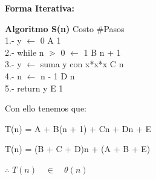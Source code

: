 \documentclass[spanish]{article}
\begin{document}
	\bigskip

	{\bf{Forma Iterativa:}}

	\bigskip

	{\bf Algoritmo S(n)} \hspace{40mm}Costo \hspace{12mm} \#Pasos \\
	1.- \hspace{0.7cm}y $\leftarrow$ 0 \hspace{5.6cm} A \hspace{2.0cm} 1\\
	2.- \hspace{0.7cm}while n $\gtrdot$ 0 $\leftarrow$ 1 \hspace{4.0cm} B \hspace{2.0cm} n + 1\\
	3.-	\hspace{0.7cm}y $\leftarrow$ suma y  con x*x*x \hspace{3.0cm} C \hspace{2.0cm} n \\
	4.-	\hspace{0.7cm}n $\leftarrow$ n - 1 \hspace{5.0cm} D \hspace{2.0cm} n \\
	5.- \hspace{0.7cm}return y \hspace{5.3cm} E \hspace{2.0cm} 1 \\
	\bigskip

	Con ello tenemos que:

	T(n) = A + B(n + 1) + Cn + Dn + E
	\bigskip
	
	T(n) = (B + C + D)n + (A + B + E)
	\bigskip

	$\therefore$
	$ T(n) \quad\in\quad \theta(n)$		

	\bigskip

	\newpage

	\bigskip

	
\end{document}
